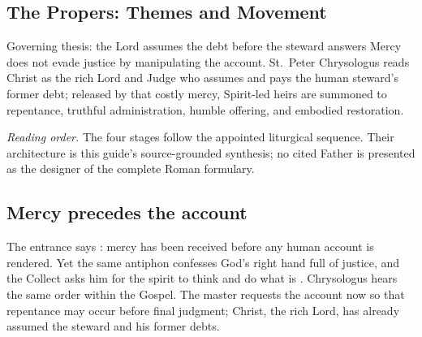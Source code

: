\begin{deepstudy}
\clearpage

\section*{The Propers: Themes and Movement}

\begin{massbox}{Governing thesis: the Lord assumes the debt before the steward answers}
Mercy does not evade justice by manipulating the account. St.~Peter Chrysologus reads Christ as the rich Lord and Judge who assumes and pays the human steward's former debt; released by that costly mercy, Spirit-led heirs are summoned to repentance, truthful administration, humble offering, and embodied restoration.
\end{massbox}

\begin{center}
\end{center}

\noindent\emph{Reading order.} The four stages follow the appointed liturgical sequence. Their architecture is this guide's source-grounded synthesis; no cited Father is presented as the designer of the complete Roman formulary.

\subsection*{Mercy precedes the account\enspace{}}

The entrance says : mercy has been received before any human account is rendered. Yet the same antiphon confesses God's right hand full of justice, and the Collect asks him for the spirit to think and do what is . Chrysologus hears the same order within the Gospel. The master requests the account now so that repentance may occur before final judgment; Christ, the rich Lord, has already assumed the steward and his former debts.


\end{deepstudy}
